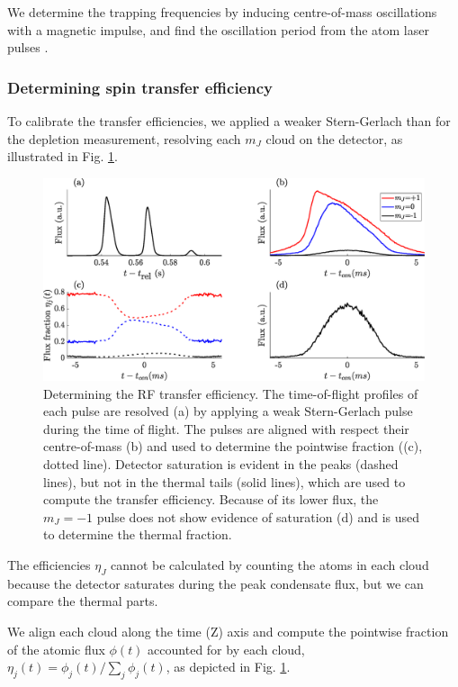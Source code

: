 	We determine the trapping frequencies by inducing centre-of-mass oscillations with a magnetic impulse, and find the oscillation period from the atom laser pulses \cite{henson18ML}.


\subsubsection{Determining spin transfer efficiency}

	To calibrate the transfer efficiencies, we applied a weaker Stern-Gerlach than for the depletion measurement, resolving each $m_J$ cloud on the detector, as illustrated in Fig.
	\ref{fig:frac_cal}.
	

	\begin{figure}[!t]
	\begin{center}
		\includegraphics[width=\columnwidth]{fig/depletion/frac_cal_profile}
		\caption{Determining the RF transfer efficiency.
	The time-of-flight profiles of each pulse are resolved (a) by applying a weak Stern-Gerlach pulse during the time of flight.
	The pulses are aligned with respect their centre-of-mass (b) and used to determine the pointwise fraction ((c), dotted line).
	Detector saturation is evident in the peaks (dashed lines), but not in the thermal tails (solid lines), which are used to compute the transfer efficiency.
	Because of its lower flux, the $m_J=-1$ pulse does not show evidence of saturation (d) and is used to determine the thermal fraction.}
		\label{fig:frac_cal}
	\end{center}
	\end{figure}

	The efficiencies $\eta_J$ cannot be calculated by counting the atoms in each cloud because the detector saturates during the peak condensate flux, but we can compare the thermal parts.
	
	We align each cloud along the time (Z) axis and compute the pointwise fraction of the atomic flux $\phi(t)$ accounted for by each cloud, $\eta_j(t) = \phi_j(t)/\sum_j\phi_j(t)$, as depicted in Fig.
	\ref{fig:frac_cal}.
	
